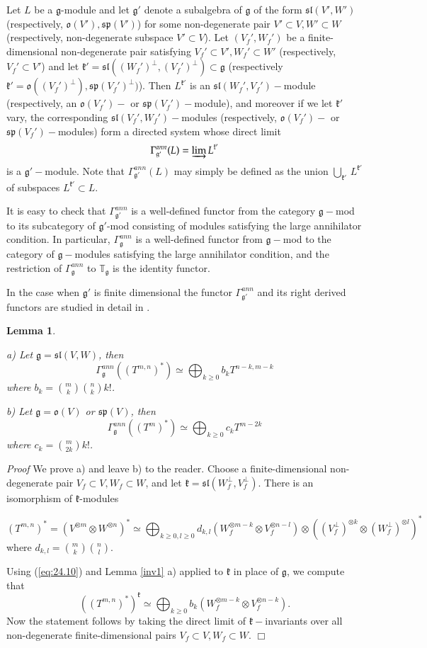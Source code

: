 \documentclass{svmult}
\newtheorem{lem}[theo]{Lemma}
\renewenvironment{proof}{ \emph{Proof}}{$\Box$}
\renewcommand{\sp}{\mathfrak{sp}}
\renewcommand{\sl}{\mathfrak{sl}}
\newcommand{\kk}{\mathfrak{k}}
\newcommand{\oo}{\mathfrak{o}}
\renewcommand{\gg}{\mathfrak{g}}
\begin{document}
Let $L$ be a $\gg$-module and let $\gg'$ denote a subalgebra of $\gg$
of the form $\sl(V', W')$ (respectively, $\oo(V'),\sp(V')$) 
for some non-degenerate pair 
$V'\subset V, W'\subset W$ (respectively, non-degenerate subspace $V' \subset V$). 
Let $(V_f',W_f')$ be a finite-dimensional non-degenerate pair satisfying
$V_f'\subset V', W_f'\subset W'$ (respectively, $V_f'\subset V'$) and
let 
$\kk'=\sl((W_f')^\perp,(V_f')^\perp)\subset \gg$ (respectively $\kk'=\oo((V_f')^\perp), \sp(V_f')^\perp)$). 
Then $L^{\kk'}$ is an $\sl(W_f',V_f')-$module (respectively, an
$\oo(V_f')-$ or $\sp(V_f')-$module), 
and moreover if we let $\kk'$ vary, the corresponding
$\sl(V_f',W_f')-$modules 
(respectively, $\oo(V_f')-$ or $\sp(V_f')-$modules) form a directed
system whose direct limit 
$$\Gamma^{ann}_{\gg'}(L) = \varinjlim L^{\kk'}$$ is a $\gg'-$module. Note
that $\Gamma_{\gg'}^{ann}(L)$ may simply be defined as the union
$\bigcup_{\kk'}\,L^{\kk'}$ of subspaces $L^{\kk'} \subset L$. 

It is easy to check that $\Gamma^{ann}_{\gg'}$ is a well-defined functor from the category
$\gg-$mod to its subcategory of $\gg'$-mod consisting of modules
satisfying the large annihilator condition. In particular,
$\Gamma_\gg^{ann}$ is a well-defined functor from $\gg-$mod to the category
of $\gg-$modules satisfying the large annihilator condition, and the
restriction of 
$\Gamma^{ann}_\gg$ to $\mathbb T_\gg$ is the identity functor.

In the case when $\gg'$ is finite dimensional the functor $\Gamma^{ann}_{\gg'}$ and its right derived functors are studied in detail in \cite{SSW}. 

\begin{lem}\label{inv2} 

a) Let $\gg=\sl(V,W)$, then
$$\Gamma_\gg^{ann}((T^{m,n})^*) \simeq \bigoplus_{k\geq0}b_kT^{n-k,m-k}$$
where $b_k=\binom{m}{k}\binom{n}{k}k!$.

b)  Let $\gg=\oo(V)$ or $\sp(V)$, then
$$\Gamma_\gg^{ann}((T^m)^*) \simeq \bigoplus_{k\geq0}c_kT^{m-2k}$$
where $c_k=\binom{m}{2k}k!$.
\end{lem} 

\begin{proof} We prove a) and leave b) to the reader.
Choose a finite-dimensional non-degenerate pair $V_f \subset V, W_f \subset W$, and let $\kk=\sl(W_f^\perp,V_f^\perp)$. There is an isomorphism of $\kk$-modules 

\begin{equation}\label{eq:24.10}
 (T^{m,n})^*=(V^{\otimes m}\otimes W^{\otimes n})^*\simeq \bigoplus_{k\geq0,l\geq0}d_{k,l}(W_f^{\otimes m-k}\otimes V_f^{\otimes n-l})\otimes ((V_f^\perp)^{\otimes k}\otimes (W_f^\perp)^{\otimes l})^*
\end{equation}
where $d_{k,l}=\binom{m}{k}\binom{n}{l}$.

Using (\ref{eq:24.10}) and Lemma \ref{inv1} a) applied to $\kk$ in place of $\gg$, we compute that
$$\left((T^{m,n})^*\right)^\kk\simeq  \bigoplus_{k\geq0}b_{k}(W_f^{\otimes m-k}\otimes V_f^{\otimes n-k}).$$
Now the statement follows by taking the direct limit of $\kk-$invariants over all non-degenerate finite-dimensional pairs $V_f\subset V, W_f\subset W$.
\end{proof}
\end{document}
